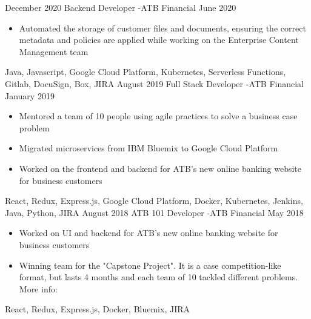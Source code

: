 
\begin{experiences}
  \experience
    {December 2020}   {Backend Developer -}{ATB Financial}{}
    {June 2020} {
                      \begin{itemize}
                        \item Automated the storage of customer files and
                          documents, ensuring the correct metadata and policies
                          are applied while working on the Enterprise Content
                          Management team
                      \end{itemize}
                    }
                    {
                        Java,
                        Javascript,
                        Google Cloud Platform,
                        Kubernetes,
                        Serverless Functions,
                        Gitlab,
                        DocuSign,
                        Box,
                        JIRA
                    }
  \emptySeparator
  \experience
    {August 2019}   {Full Stack Developer -}{ATB Financial}{}
    {January 2019} {
                      \begin{itemize}
                        \item Mentored a team of 10 people using agile
                          practices to solve a business case problem
                        \item Migrated microservices from IBM Bluemix to Google
                          Cloud Platform
                        \item Worked on the frontend and backend
                          for ATB's new online banking website for business
                          customers
                      \end{itemize}
                    }
                    {
                        React,
                        Redux,
                        Express.js,
                        Google Cloud Platform,
                        Docker,
                        Kubernetes,
                        Jenkins,
                        Java,
                        Python,
                        JIRA
                    }
  \emptySeparator
  \experience
  {August 2018}   {ATB 101 Developer -}{ATB Financial}{}
  {May 2018} {
                    \begin{itemize}
                      \item Worked on UI and backend for ATB's new online banking website for business customers
                      \item Winning team for the "Capstone Project". It is a case competition-like format,
                      but lasts 4 months and each team of 10 tackled different problems.
                      More info: 
                    \end{itemize}
                  }
                  {
                      React,
                      Redux,
                      Express.js,
                      Docker,
                      Bluemix,
                      JIRA
                  }
\end{experiences}
